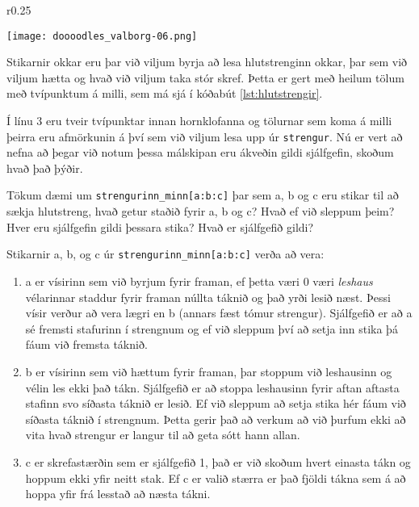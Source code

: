 \begin{wrapfigure}{r}{0.25\textwidth}
	\begin{center}
		\texttt{[image: doooodles\_valborg-06.png]}
	\end{center}
\end{wrapfigure}

Stikarnir okkar eru þar við viljum byrja að lesa hlutstrenginn okkar, þar sem við viljum hætta og hvað við viljum taka stór skref.
Þetta er gert með heilum tölum með tvípunktum á milli, sem má sjá í kóðabút \ref{lst:hlutstrengir}.

Í línu 3 eru tveir tvípunktar innan hornklofanna og tölurnar sem koma á milli þeirra eru afmörkunin á því sem við viljum lesa upp úr \texttt{strengur}.
Nú er vert að nefna að þegar við notum þessa málskipan eru ákveðin gildi sjálfgefin, skoðum hvað það þýðir.

Tökum dæmi um \texttt{strengurinn\_minn[a:b:c]} þar sem a, b og c eru stikar til að sækja hlutstreng, hvað getur staðið fyrir a, b og c?
Hvað ef við sleppum þeim?
Hver eru sjálfgefin gildi þessara stika?
Hvað er sjálfgefið gildi?

\newpage
Stikarnir a, b, og c úr \texttt{strengurinn\_minn[a:b:c]} verða að vera:
\begin{enumerate}
	\item a er vísirinn sem við byrjum fyrir framan, ef þetta væri 0 væri \textit{leshaus} vélarinnar staddur fyrir framan núllta táknið og það yrði lesið næst.
	Þessi vísir verður að vera lægri en b (annars fæst tómur strengur).
	Sjálfgefið er að a sé fremsti stafurinn í strengnum og ef við sleppum því að setja inn stika þá fáum við fremsta táknið.
	\item b er vísirinn sem við hættum fyrir framan, þar stoppum við leshausinn og vélin les ekki það tákn.
	Sjálfgefið er að stoppa leshausinn fyrir aftan aftasta stafinn svo síðasta táknið er lesið.
	Ef við sleppum að setja stika hér fáum við síðasta táknið í strengnum.
	Þetta gerir það að verkum að við þurfum ekki að vita hvað strengur er langur til að geta sótt hann allan.
	\item c er skrefastærðin sem er sjálfgefið 1, það er við skoðum hvert einasta tákn og hoppum ekki yfir neitt stak.
	Ef c er valið stærra er það fjöldi tákna sem á að hoppa yfir frá lesstað að næsta tákni.
\end{enumerate}

